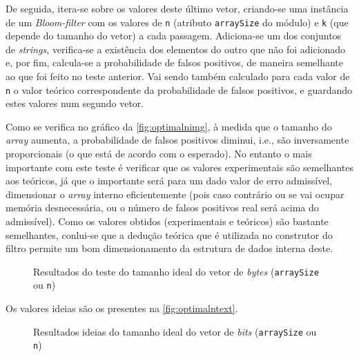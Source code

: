 \documentclass[a4paper,11pt,openright,oneside]{report}
\begin{document}
De seguida, itera-se sobre os valores deste último vetor, criando-se uma instância de um \textit{Bloom-filter} com os valores de \texttt{n} (atributo \texttt{arraySize} do módulo) e \texttt{k} (que depende do tamanho do vetor) a cada passagem. Adiciona-se um dos conjuntos de \textit{strings}, verifica-se a existência dos elementos do outro que não foi adicionado e, por fim, calcula-se a probabilidade de falsos positivos, de maneira semelhante ao que foi feito no teste anterior. Vai sendo também calculado para cada valor de \texttt{n} o valor teórico correspondente da probabilidade de falsos positivos, e guardando estes valores num segundo vetor.

Como se verifica no gráfico da \autoref{fig:optimalnimg}, à medida que o tamanho do \textit{array} aumenta, a probabilidade de falsos positivos diminui, i.e., são inversamente proporcionais (o que está de acordo com o esperado). No entanto o mais importante com este teste é verificar que os valores experimentais são semelhantes aos teóricos, já que o importante será para um dado valor de erro admissível, dimensionar o \textit{array} interno eficientemente (pois caso contrário ou se vai ocupar memória desnecessária, ou o número de falsos positivos real será acima do admissível). Como os valores obtidos (experimentais e teóricos) são bastante semelhantes, conlui-se que a dedução teórica que é utilizada no construtor do filtro permite um bom dimensionamento da estrutura de dados interna deste.

\begin{figure}[ht]
\center
{}
\caption{Resultados do teste do tamanho ideal do vetor de \textit{bytes} (\texttt{arraySize} ou \texttt{n})}
\label{fig:optimalnimg}
\end{figure}

Os valores ideias são os presentes na \autoref{fig:optimalntext}.

\begin{figure}[ht]
\center
{}
\caption{Resultados ideias do tamanho ideal do vetor de \textit{bits} (\texttt{arraySize} ou \texttt{n})}
\label{fig:optimalntext}
\end{figure}
\end{document}
